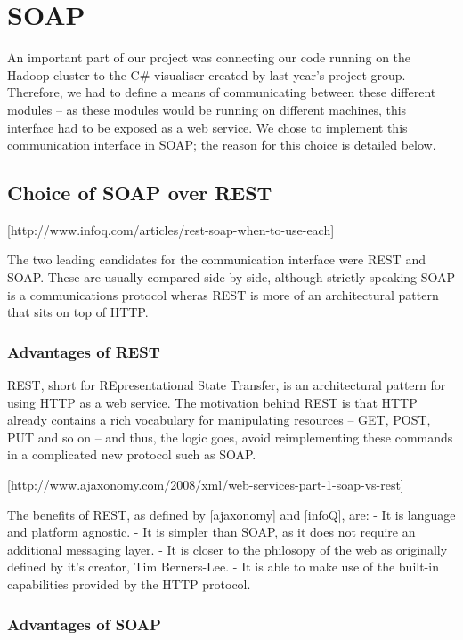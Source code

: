 \section{SOAP}

An important part of our project was connecting our code running on the Hadoop cluster to the C\# visualiser created by last year's project group. Therefore, we had to define a means of communicating between these different modules -- as these modules would be running on different machines, this interface had to be exposed as a web service. We chose to implement this communication interface in SOAP; the reason for this choice is detailed below.

\subsection{Choice of SOAP over REST}

[http://www.infoq.com/articles/rest-soap-when-to-use-each]

The two leading candidates for the communication interface were REST and SOAP. These are usually compared side by side, although strictly speaking SOAP is a communications protocol wheras REST is more of an architectural pattern that sits on top of HTTP.

\subsubsection{Advantages of REST}

REST, short for REpresentational State Transfer, is an architectural pattern for using HTTP as a web service. The motivation behind REST is that HTTP already contains a rich vocabulary for manipulating resources -- GET, POST, PUT and so on -- and thus, the logic goes, avoid reimplementing these commands in a complicated new protocol such as SOAP.

[http://www.ajaxonomy.com/2008/xml/web-services-part-1-soap-vs-rest]

The benefits of REST, as defined by [ajaxonomy] and [infoQ], are:
- It is language and platform agnostic.
- It is simpler than SOAP, as it does not require an additional messaging layer.
- It is closer to the philosopy of the web as originally defined by it's creator, Tim Berners-Lee.
- It is able to make use of the built-in capabilities provided by the HTTP protocol.

\subsubsection{Advantages of SOAP}

